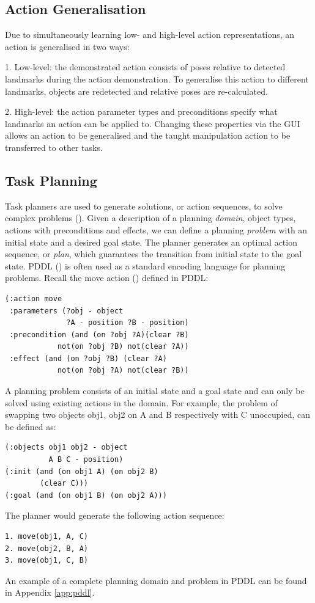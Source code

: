 \subsection{Action Generalisation}
\label{sec:generalisation}
Due to simultaneously learning low- and high-level action representations, an action is generalised in two ways:

1. Low-level: the demonstrated action consists of poses relative to detected landmarks during the action demonstration. 
To generalise this action to different landmarks, objects are redetected and relative poses are re-calculated.

2. High-level: the action parameter types and preconditions specify what landmarks an action can be applied to. 
Changing these properties via the GUI allows an action to be generalised and the taught manipulation action to be transferred to other tasks.


\subsection{Task Planning}
\label{sec:planning}
Task planners are used to generate solutions, or action sequences, to solve complex problems ().
Given a description of a planning \textit{domain}, \ie object types, actions with preconditions and effects, we can define a planning \textit{problem} with an initial state and a desired goal state. 
The planner generates an optimal action sequence, or \textit{plan}, which guarantees the transition from initial state to the goal state. 
PDDL () %
is often used as a standard encoding language for planning problems.
Recall the move action () defined in PDDL:

\begin{verbatim}
(:action move
 :parameters (?obj - object 
              ?A - position ?B - position)
 :precondition (and (on ?obj ?A)(clear ?B)
            not(on ?obj ?B) not(clear ?A))
 :effect (and (on ?obj ?B) (clear ?A)
            not(on ?obj ?A) not(clear ?B))
\end{verbatim}

A planning problem consists of an initial state and a goal state and can only be solved using existing actions in the domain.
For example, the problem of swapping two objects obj1, obj2 on A and B respectively with C unoccupied, can be defined as:
\begin{verbatim}
(:objects obj1 obj2 - object
          A B C - position)
(:init (and (on obj1 A) (on obj2 B) 
        (clear C)))
(:goal (and (on obj1 B) (on obj2 A)))
\end{verbatim}
The planner would generate the following action sequence:
\begin{verbatim}
1. move(obj1, A, C)
2. move(obj2, B, A)
3. move(obj1, C, B)
\end{verbatim}
An example of a complete planning domain and problem in PDDL can be found in Appendix \ref{app:pddl}.


